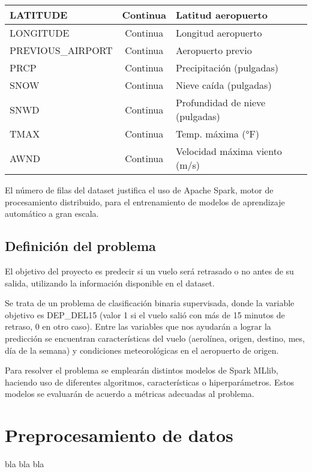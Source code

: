 \documentclass[runningheads]{llncs}
\begin{document}
\begin{table}[h!]
\begin{tabular}{|l|c|l|}
LATITUDE & Continua & Latitud aeropuerto \\ \hline
LONGITUDE & Continua & Longitud aeropuerto \\ \hline
PREVIOUS\_AIRPORT & Continua & Aeropuerto previo \\ \hline
PRCP & Continua & Precipitación (pulgadas) \\ \hline
SNOW & Continua & Nieve caída (pulgadas) \\ \hline
SNWD & Continua & Profundidad de nieve (pulgadas) \\ \hline
TMAX & Continua & Temp. máxima (°F) \\ \hline
AWND & Continua & Velocidad máxima viento (m/s) \\ \hline
\end{tabular}
\end{table}

El número de filas del dataset justifica el uso de Apache Spark, motor de procesamiento 
distribuido, para el entrenamiento de modelos de aprendizaje automático a gran escala.

\subsection{Definición del problema}
El objetivo del proyecto es predecir si un vuelo será retrasado o no antes de su salida, 
utilizando la información disponible en el dataset.

Se trata de un problema de clasificación binaria supervisada, donde la variable objetivo es 
DEP\_DEL15 (valor 1 si el vuelo salió con más de 15 minutos de retraso, 0 en otro caso). 
Entre las variables que nos ayudarán a lograr la predicción se encuentran características 
del vuelo (aerolínea, origen, destino, mes, día de la semana) y condiciones meteorológicas 
en el aeropuerto de origen.

Para resolver el problema se emplearán distintos modelos de Spark MLlib, haciendo uso de 
diferentes algoritmos, características o hiperparámetros. Estos modelos se evaluarán de 
acuerdo a métricas adecuadas al problema.


\section{Preprocesamiento de datos}

bla bla bla
\end{document}
